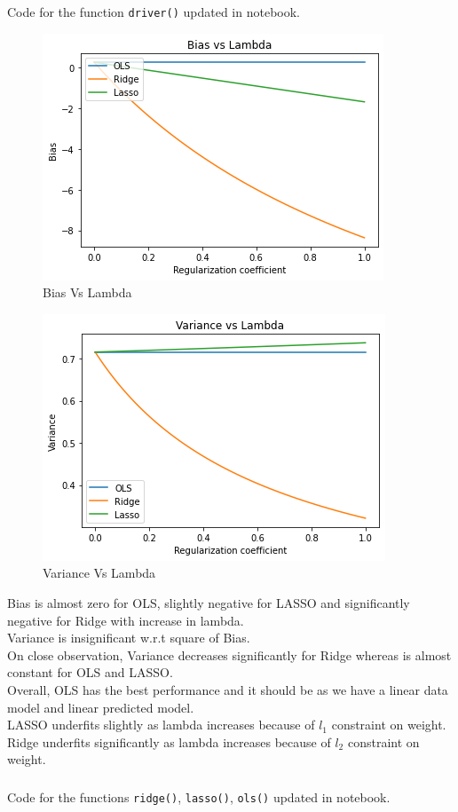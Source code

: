 \documentclass[12pt, fleqn]{article}
\begin{document}
\subsubsection{}
Code for the function \verb!driver()! updated in notebook.
\begin{figure}[H]
  \centering
  \includegraphics[scale=0.7]{bias.png}
  \caption{Bias Vs Lambda}
\end{figure}
\begin{figure}[H]
  \centering
  \includegraphics[scale=0.7]{variance.png}
  \caption{Variance Vs Lambda}
\end{figure}

Bias is almost zero for OLS, slightly negative for LASSO and significantly negative for Ridge with increase in lambda. \\
Variance is insignificant w.r.t square of Bias. \\
On close observation, Variance decreases significantly for Ridge whereas is almost constant for OLS and LASSO. \\
Overall, OLS has the best performance and it should be as we have a linear data model and linear predicted model. \\
LASSO underfits slightly as lambda increases because of $l_1$ constraint on weight. \\
Ridge underfits significantly as lambda increases because of $l_2$ constraint on weight. \\

\subsubsection{}
Code for the functions \verb!ridge()!, \verb!lasso()!, \verb!ols()! updated in notebook.
\end{document}

